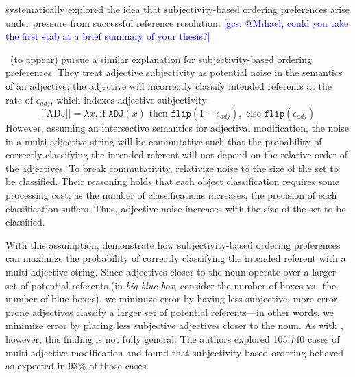 \documentclass[10pt,a4paper]{article}
\newcommand{\sem}[1]{\mbox{$[\![$#1$]\!]$}}
\newcommand{\gcs}[1]{\textcolor{blue}{[gcs: #1]}}
\begin{document}
 systematically explored the idea that subjectivity-based ordering preferences arise under pressure from successful reference resolution. \gcs{@Mihael, could you take the first stab at a brief summary of your thesis?}

\citeauthor{scontrasetalSPadjectives}~(to appear) pursue a similar explanation for subjectivity-based ordering preferences. They treat adjective subjectivity as potential noise in the semantics of an adjective; the adjective will incorrectly classify intended referents at the rate of $\epsilon_{adj}$, which indexes adjective subjectivity:
$$\sem{ADJ} = \lambda x.\ \textrm{if } \texttt{ADJ}(x) \textrm{ then } \texttt{flip}(1- \epsilon_{adj}), \textrm{ else } \texttt{flip}(\epsilon_{adj})$$
However, assuming an intersective semantics for adjectival modification, the noise in a multi-adjective string will be commutative such that the probability of correctly classifying the intended referent will not depend on the relative order of the adjectives. To break commutativity, \citeauthor{scontrasetalSPadjectives} relativize noise to the size of the set to be classified. Their reasoning holds that each object classification requires some processing cost; as the number of classifications increases, the precision of each classification suffers. Thus, adjective noise increases with the size of the set to be classified. 

With this assumption, \citeauthor{scontrasetalSPadjectives} demonstrate how subjectivity-based ordering preferences can maximize the probability of correctly classifying the intended referent with a multi-adjective string. Since adjectives closer to the noun operate over a larger set of potential referents (in \emph{big blue box}, consider the number of boxes vs.~the number of blue boxes), we minimize error by having less subjective, more error-prone adjectives classify a larger set of potential referents---in other words, we minimize error by placing less subjective adjectives closer to the noun. As with , however, this finding is not fully general. The authors explored 103,740 cases of multi-adjective modification and found that subjectivity-based ordering behaved as expected in 93\% of those cases.
\end{document}

